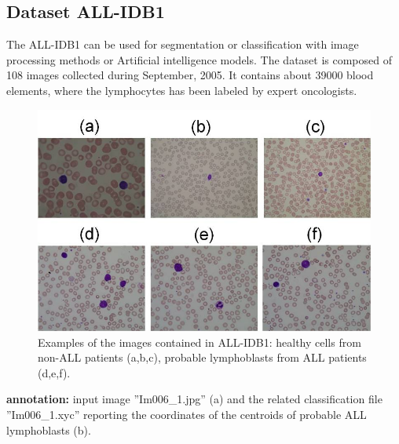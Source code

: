 \subsection{Dataset ALL-IDB1}

The ALL-IDB1 can be used for segmentation or classification with image processing methods or Artificial intelligence models. The dataset is composed of 108 images collected during September, 2005. It contains about 39000 blood elements, where the lymphocytes has been labeled by expert oncologists.

\begin{figure}[H]
\centering
\includegraphics{../images/ALLIDB1.jpg}
\caption{Examples of the images contained in ALL-IDB1: healthy cells from non-ALL patients (a,b,c), probable lymphoblasts from ALL patients (d,e,f). }
\end{figure}


\textbf{annotation:} input image ''Im006\_1.jpg'' (a) and the related classification file ''Im006\_1.xyc'' reporting the coordinates of the centroids of probable ALL lymphoblasts (b).



